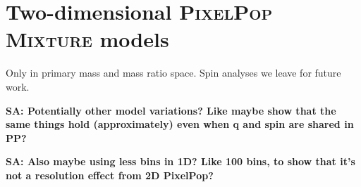 \documentclass[twocolumn,twocolappendix,linenumbers]{aastex631}
\newcommand{\sa}[1]{{\bf\color{Thistle}SA: #1}}
\newcommand{\PPMixture}{\textsc{PixelPop Mixture}\xspace}
\begin{document}
\section{Two-dimensional \PPMixture models}\label{app:2d-pp-mixture}

Only in primary mass and mass ratio space. Spin analyses we leave for future work. 

\sa{Potentially other model variations? Like maybe show that the same things hold (approximately) even when q and spin are shared in PP? }

\sa{Also maybe using less bins in 1D? Like 100 bins, to show that it's not a resolution effect from 2D PixelPop?}



\end{document}
